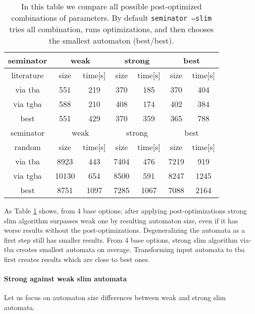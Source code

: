 \documentclass[
	digital,
nolof, nolot
]{fithesis3}
\begin{document}
	\begin{table}[ht]
		
		\centering
		\caption{In this table we compare all possible post-optimized combinations of parameters. By default \texttt{seminator --slim} tries all combination, runs optimizations, and then chooses the smallest automaton (best/best). }
		\label{table:seminator:optimized}
		\begin{tabular}{ |c||c|c|c|c|c|c| } 
			\hline
			seminator&\multicolumn{2}{c|}{weak}&\multicolumn{2}{c|}{strong}&\multicolumn{2}{c|}{best} \\
			\hline
			literature&size&time[s]&size&time[s]&size&time[s]\\
			\hhline{|=======|}
			
			via tba&551&219& 370 &185& 370&404\\
			\hline
			via tgba&588&210& 408&174& 402&384\\ 
			\hline
			best&551&429& 370&359& 365&788 \\ 
			\hline
			
			
			\hline
			seminator&\multicolumn{2}{c|}{weak}&\multicolumn{2}{c|}{strong}&\multicolumn{2}{c|}{best} \\
			\hline
			random&size&time[s]&size&time[s]&size&time[s]\\
			\hhline{|=======|}
			via tba&8923&443& 7404 &476& 7219&919\\
			\hline
			via tgba&10130&654& 8500&591& 8247&1245\\ 
			\hline
			best&8751&1097& 7285&1067& 7088&2164 \\ 
			\hline
		\end{tabular}
	\end{table}

	
	As Table \ref{table:seminator:optimized} shows, from 4 base options; after applying post-optimizations strong slim algorithm surpasses weak one by resulting automaton size, even if it has worse results without the post-optimizations.
	Degeneralizing the automata as a first step still has smaller results.
	From 4 base options, strong slim algorithm via-tba creates smallest automata on average.
	Transforming input automata to tba first creates results which are close to best ones. 
	
	
	\paragraph{Strong against weak slim automata}
	Let us focus on automaton size differences between weak and strong slim automata.
	
\end{document}
